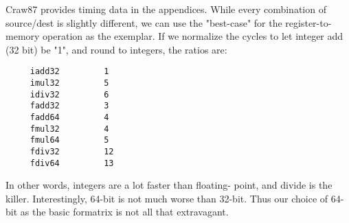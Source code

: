 Craw87 provides timing data in the appendices.  While every
combination of source/dest is slightly different, we can use
the "best-case" for the register-to-memory operation as the
exemplar.  If we normalize the cycles to let integer add (32
bit) be "1", and round to integers, the ratios are:
\begin{verbatim}
     iadd32         1
     imul32         5
     idiv32         6
     fadd32         3
     fadd64         4
     fmul32         4
     fmul64         5
     fdiv32         12
     fdiv64         13
\end{verbatim}

In other words, integers are a lot faster than floating-
point, and divide is the killer.  Interestingly, 64-bit is
not much worse than 32-bit.  Thus our choice of 64-bit as
the basic formatrix is not all that extravagant.


